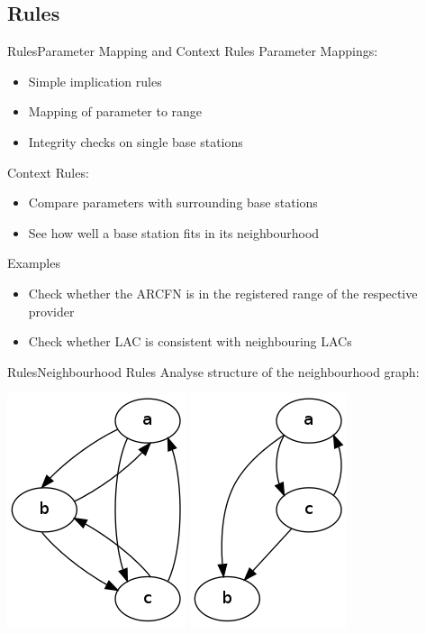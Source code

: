 \documentclass{beamer}
\begin{document}
\subsection{Rules}
\begin{frame}{Rules}{Parameter Mapping and Context Rules}
Parameter Mappings:
\begin{itemize}
	\item Simple implication rules
	\item Mapping of parameter to range
	\item Integrity checks on single base stations
\end{itemize}
Context Rules:
\begin{itemize}
	\item Compare parameters with surrounding base stations
	\item See how well a base station fits in its neighbourhood
\end{itemize}
\begin{exampleblock}{Examples}
\begin{itemize}
	\item Check whether the ARCFN is in the registered range of the respective provider
	\item Check whether LAC is consistent with neighbouring LACs
\end{itemize}
\end{exampleblock}
\end{frame}

\begin{frame}{Rules}{Neighbourhood Rules}
Analyse structure of the neighbourhood graph:
\begin{center}
\includegraphics[width=.3\textwidth]{neighbourhood1}\hspace{1cm}
\includegraphics[width=.3\textwidth]{neighbourhood2}
\end{center}
\end{frame}
\end{document}
